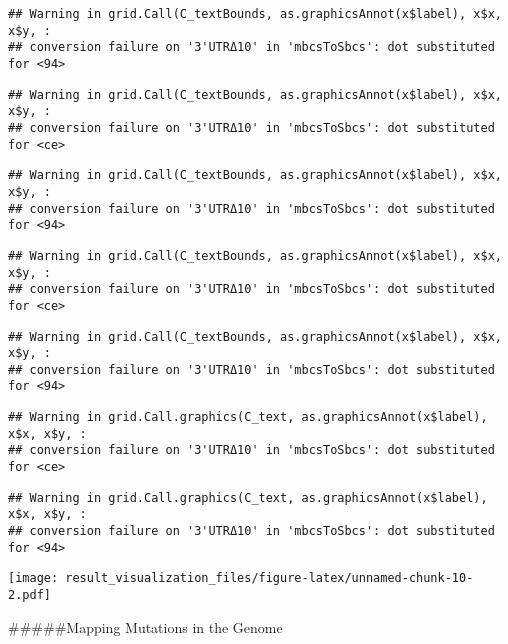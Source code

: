 \documentclass[
]{article}
\begin{document}
\begin{verbatim}
## Warning in grid.Call(C_textBounds, as.graphicsAnnot(x$label), x$x, x$y, :
## conversion failure on '3'UTRΔ10' in 'mbcsToSbcs': dot substituted for <94>
\end{verbatim}

\begin{verbatim}
## Warning in grid.Call(C_textBounds, as.graphicsAnnot(x$label), x$x, x$y, :
## conversion failure on '3'UTRΔ10' in 'mbcsToSbcs': dot substituted for <ce>
\end{verbatim}

\begin{verbatim}
## Warning in grid.Call(C_textBounds, as.graphicsAnnot(x$label), x$x, x$y, :
## conversion failure on '3'UTRΔ10' in 'mbcsToSbcs': dot substituted for <94>
\end{verbatim}

\begin{verbatim}
## Warning in grid.Call(C_textBounds, as.graphicsAnnot(x$label), x$x, x$y, :
## conversion failure on '3'UTRΔ10' in 'mbcsToSbcs': dot substituted for <ce>
\end{verbatim}

\begin{verbatim}
## Warning in grid.Call(C_textBounds, as.graphicsAnnot(x$label), x$x, x$y, :
## conversion failure on '3'UTRΔ10' in 'mbcsToSbcs': dot substituted for <94>
\end{verbatim}

\begin{verbatim}
## Warning in grid.Call.graphics(C_text, as.graphicsAnnot(x$label), x$x, x$y, :
## conversion failure on '3'UTRΔ10' in 'mbcsToSbcs': dot substituted for <ce>
\end{verbatim}

\begin{verbatim}
## Warning in grid.Call.graphics(C_text, as.graphicsAnnot(x$label), x$x, x$y, :
## conversion failure on '3'UTRΔ10' in 'mbcsToSbcs': dot substituted for <94>
\end{verbatim}

\texttt{[image: result\_visualization\_files/figure-latex/unnamed-chunk-10-2.pdf]}

\#\#\#\#\#Mapping Mutations in the Genome
\end{document}
